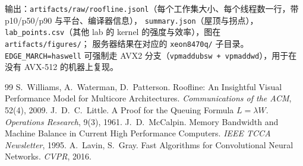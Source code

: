 \documentclass[11pt,a4paper]{ctexart}
\begin{document}
输出：\nolinkurl{artifacts/raw/roofline.jsonl}（每个工作集大小、每个线程数一行，带 p10/p50/p90 与平台、编译器信息），
\texttt{summary.json}（屋顶与拐点），\texttt{lab\_points.csv}（其他 lab 的 kernel 的强度与效率），图在 \nolinkurl{artifacts/figures/}；
服务器结果在对应的 \texttt{xeon8470q/} 子目录。\texttt{EDGE\_MARCH=haswell} 可强制走 AVX2 分支（\texttt{vpmaddubsw + vpmaddwd}），用于在没有 AVX-512 的机器上复现。


\begin{thebibliography}{99}
 S.~Williams, A.~Waterman, D.~Patterson. Roofline: An Insightful Visual Performance Model for Multicore Architectures. \emph{Communications of the ACM}, 52(4), 2009.
 J.~D.~C.~Little. A Proof for the Queuing Formula $L=\lambda W$. \emph{Operations Research}, 9(3), 1961.
 J.~D.~McCalpin. Memory Bandwidth and Machine Balance in Current High Performance Computers. \emph{IEEE TCCA Newsletter}, 1995.
 A.~Lavin, S.~Gray. Fast Algorithms for Convolutional Neural Networks. \emph{CVPR}, 2016.
\end{thebibliography}
\end{document}
